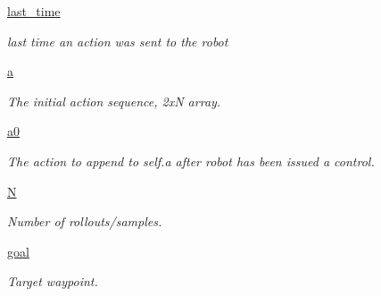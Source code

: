 \begin{DoxyCompactItemize}
\hyperlink{classmppi__control_1_1mppi__lib_1_1mppi_ac1691574dab02ec8debf400937af9048}{last\+\_\+time}
\begin{DoxyCompactList}\small\item\em last time an action was sent to the robot \end{DoxyCompactList}\item 
\mbox{\label{classmppi__control_1_1mppi__lib_1_1mppi_a1ee8d442a2e68fbd95869aeb88ede25b}} 
\hyperlink{classmppi__control_1_1mppi__lib_1_1mppi_a1ee8d442a2e68fbd95869aeb88ede25b}{a}
\begin{DoxyCompactList}\small\item\em The initial action sequence, 2xN array. \end{DoxyCompactList}\item 
\mbox{\label{classmppi__control_1_1mppi__lib_1_1mppi_a05d14b2217b17ee2d89968cb52f99d63}} 
\hyperlink{classmppi__control_1_1mppi__lib_1_1mppi_a05d14b2217b17ee2d89968cb52f99d63}{a0}
\begin{DoxyCompactList}\small\item\em The action to append to self.\+a after robot has been issued a control. \end{DoxyCompactList}\item 
\mbox{\label{classmppi__control_1_1mppi__lib_1_1mppi_a87e95b1bcdc996d76c4cb69d7ad27155}} 
\hyperlink{classmppi__control_1_1mppi__lib_1_1mppi_a87e95b1bcdc996d76c4cb69d7ad27155}{N}
\begin{DoxyCompactList}\small\item\em Number of rollouts/samples. \end{DoxyCompactList}\item 
\mbox{\label{classmppi__control_1_1mppi__lib_1_1mppi_a68ee5156799bb07db88f240790c5cf5f}} 
\hyperlink{classmppi__control_1_1mppi__lib_1_1mppi_a68ee5156799bb07db88f240790c5cf5f}{goal}
\begin{DoxyCompactList}\small\item\em Target waypoint. \end{DoxyCompactList}\item 
\mbox{\label{classmppi__control_1_1mppi__lib_1_1mppi_af081d09b4ae3afab898e57cfe2c8fc7f}} 

\end{DoxyCompactItemize}
